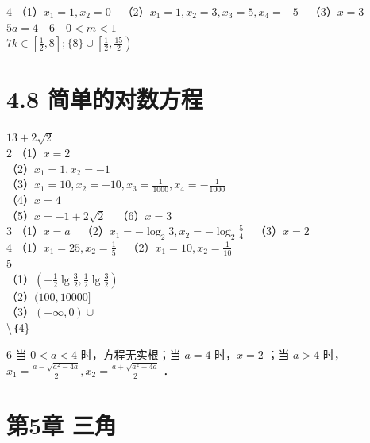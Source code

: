 \documentclass[10pt]{article}
\begin{document}
4 （1）\(x_{1}=1, x_{2}=0 \quad\)（2）\(x_{1}=1, x_{2}=3, x_{3}=5, x_{4}=-5 \quad\)（3）\(x=3\)\\
\(5 a=4 \quad 6 \quad 0<m<1\)\\
\(7 k \in\left[\frac{1}{2}, 8\right] ;\{8\} \cup\left[\frac{1}{2}, \frac{15}{2}\right)\)

\section*{4.8 简单的对数方程}
\(13+2 \sqrt{2}\)\\
2 （1）\(x=2\)\\
（2）\(x_{1}=1, x_{2}=-1\)\\
（3）\(x_{1}=10, x_{2}=-10, x_{3}=\frac{1}{1000}, x_{4}=-\frac{1}{1000}\)\\
（4）\(x=4\)\\
（5）\(x=-1+2 \sqrt{2} \quad\)（6）\(x=3\)\\
3 （1）\(x=a \quad\)（2）\(x_{1}=-\log _{2} 3, x_{2}=-\log _{2} \frac{5}{4} \quad\)（3）\(x=2\)\\
4 （1）\(x_{1}=25, x_{2}=\frac{1}{5} \quad\)（2）\(x_{1}=10, x_{2}=\frac{1}{10}\)\\
5\\
（1）\(\left(-\frac{1}{2} \lg \frac{3}{2}, \frac{1}{2} \lg \frac{3}{2}\right)\)\\
（2）\((100,10000]\)\\
（3）\((-\infty, 0) \cup\)\\
\textbackslash ｛4\}

6 当 \(0<a<4\) 时，方程无实根；当 \(a=4\) 时，\(x=2\) ；当 \(a>4\) 时，\(x_{1}=\frac{a-\sqrt{a^{2}-4 a}}{2}, x_{2}=\frac{a+\sqrt{a^{2}-4 a}}{2}\) ．

\section*{第5章 三角}
\end{document}
